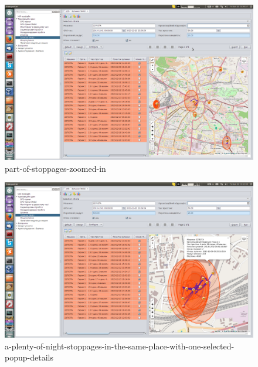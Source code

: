 \begin{figure}[H]
\centering
\includegraphics[width=\linewidth]{chapters/03-stoppages/images/23-part-of-stoppages-zoomed-in.png}
\caption{part-of-stoppages-zoomed-in}\label{fig:23}
\end{figure}

\begin{figure}[H]
\centering
\includegraphics[width=\linewidth]{chapters/03-stoppages/images/24-a-plenty-of-night-stoppages-in-the-same-place-with-one-selected-popup-details.png}
\caption{a-plenty-of-night-stoppages-in-the-same-place-with-one-selected-popup-details}\label{fig:24}
\end{figure}

